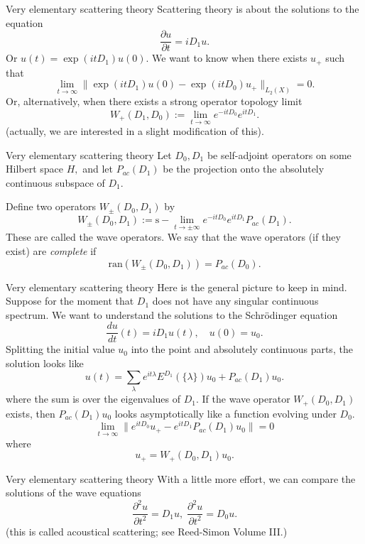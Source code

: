 \documentclass{beamer}
\numberwithin{equation}{section}
\theoremstyle{plain}
\theoremstyle{plain}
\theoremstyle{definition}
\theoremstyle{plain}
\theoremstyle{plain}
\theoremstyle{definition}
\begin{document}
\begin{frame}{Very elementary scattering theory}
  Scattering theory is about the solutions to the equation
  \[
    \frac{\partial u}{\partial t} = iD_1u.
  \]
  Or $u(t) = \exp(itD_1)u(0).$ We want to know when
  there exists $u_+$ such that
  \[
      \lim_{t\to\infty} \|\exp(itD_1)u(0)-\exp(itD_0)u_+\|_{L_2(X)} = 0.
  \]
  Or, alternatively, when there exists a strong operator topology limit
  \[
    W_+(D_1,D_0) := \lim_{t\to\infty} e^{-itD_0}e^{itD_1}.
  \]
  (actually, we are interested in a slight modification of this).
\end{frame}


\begin{frame}{Very elementary scattering theory}
  Let $D_0,D_1$ be self-adjoint operators on some Hilbert space $H,$ and let $P_{ac}(D_1)$ be the projection onto the absolutely continuous subspace of $D_1.$

  Define two operators $W_{\pm}(D_0,D_1)$ by
  \[
    W_{\pm}(D_0,D_1) := {\mathrm{s}-}\lim_{t\to\pm \infty} e^{-itD_0}e^{itD_1}P_{ac}(D_1).
  \]
  These are called the wave operators. We say that the wave operators (if they exist) are \emph{complete}
  if
  \[
      \mathrm{ran}(W_{\pm}(D_0,D_1)) = P_{ac}(D_0).
  \]
\end{frame}

\begin{frame}{Very elementary scattering theory}
  Here is the general picture to keep in mind. Suppose for the moment that $D_1$ does not have any singular continuous spectrum. We want to understand the solutions to the Schr\"odinger equation
  \[
    \frac{du}{dt}(t) = iD_1u(t),\quad u(0) = u_0.
  \]
  Splitting the initial value $u_0$ into the point and absolutely continuous parts, the solution looks like
  \[
    u(t) = \sum_{\lambda} e^{it\lambda}E^{D_1}(\{\lambda\})u_0 + P_{ac}(D_1)u_0.
  \]
  where the sum is over the eigenvalues of $D_1.$
  If the wave operator $W_{+}(D_0,D_1)$ exists, then $P_{ac}(D_1)u_0$ looks asymptotically like a function evolving under $D_0.$
  \[
      \lim_{t\to\infty} \|e^{itD_0}u_+ - e^{itD_1}P_{ac}(D_1)u_0\| = 0
  \]
  where
  \[
      u_+ =W_+(D_0,D_1)u_0.
  \]
\end{frame}


\begin{frame}{Very elementary scattering theory}
  With a little more effort, we can compare the solutions of the wave equations
  \[
    \frac{\partial^2 u}{\partial t^2} = D_1u,\; \frac{\partial^2 u}{\partial t^2} = D_0u.
  \]
  (this is called acoustical scattering; see Reed-Simon Volume III.)
\end{frame}
\end{document}
